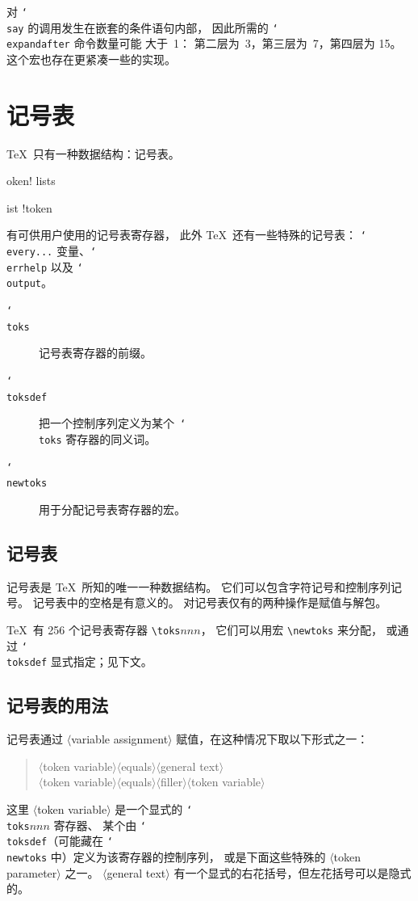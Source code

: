 \documentclass[a4paper]{rapport3}
\def\nl{\protect\\}\def\n#1{{\tt #1}}\def\cs#1{{\tt\char`\\#1}}\let\csc\cs
\def\gr#1{$\langle$#1$\rangle$}\def\key#1{{\tt#1}}
\def\alt{}\def\altt{}%
\newenvironment{disp}{\begin{quotation}}{\end{quotation}}
\newenvironment{inventory}{\begin{description}}{\end{description}}
\def\term#1\par{\index{#1}}
\begin{document}
对 \cs{say} 的调用发生在嵌套的条件语句内部，
因此所需的 \cs{expandafter} 命令数量可能 \alt 大于~1：
第二层为~3，第三层为~7，第四层为 15。
这个宏也存在更紧凑一些的实现。


\endofchapter
\chapter{记号表}\label{token}

\TeX\ 只有一种数据结构：记号表。
\term token! lists\par\term list !token\par
有可供用户使用的记号表寄存器，
此外 \TeX\ 还有一些特殊的记号表：
\cs{every...} 变量、\cs{errhelp} 以及 \cs{output}。


\begin{inventory}
\item [\cs{toks}] 
      记号表寄存器的前缀。

\item [\cs{toksdef}] 
      把一个控制序列定义为某个~\cs{toks} 寄存器的同义词。

\item [\cs{newtoks}] 
      用于分配记号表寄存器的宏。

\end{inventory}

\section{记号表}

记号表是 \TeX\ 所知的唯一一种数据结构。
它们可以包含字符记号和控制序列记号。
记号表中的空格是有意义的。
对记号表仅有的两种操作是赋值与解包。

\TeX\ 有 256 个记号表寄存器 \verb|\toks|$nnn$，
它们可以用宏 \verb|\newtoks| 来分配，
或通过 \cs{toksdef} 显式指定；见下文。

\section{记号表的用法}

记号表通过 \gr{variable assignment} 赋值，在这种情况下取以下形式之一：
\begin{disp}\gr{token variable}\gr{equals}\gr{general text}\nl
     \gr{token variable}\gr{equals}\gr{filler}\gr{token variable}\end{disp}
这里 \gr{token variable} 是一个显式的 \cs{toks}$nnn$ 寄存器、
某个由 \cs{toksdef}（可能藏在 \cs{newtoks} 中）定义为该寄存器的控制序列，
或是下面这些特殊的 \gr{token parameter} 之一。
\gr{general text} 有一个显式的右花括号，但左花括号可以是隐式的。
\end{document}
